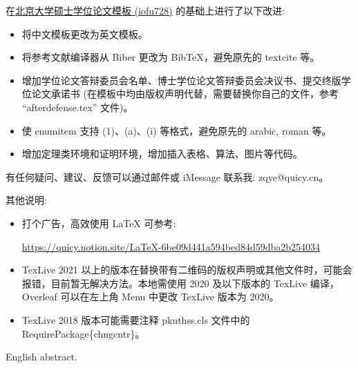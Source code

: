 \begin{cabstract}
    在\href{https://www.overleaf.com/latex/templates/2021-peking-university-master-thesis-template-iofu728-pkuthss/rwfvbkpzydpf}{北京大学硕士学位论文模板 (iofu728)} 的基础上进行了以下改进:
    \begin{itemize}
        \item 将中文模板更改为英文模板。
        \item 将参考文献编译器从 Biber 更改为 BibTeX，避免原先的 textcite 等。
        \item 增加学位论文答辩委员会名单、博士学位论文答辩委员会决议书、提交终版学位论文承诺书 (在模板中均由版权声明代替，需要替换你自己的文件，参考 ``afterdefense.tex'' 文件)。
        \item 使 enumitem 支持 (1)、(a)、(i) 等格式，避免原先的 arabic, roman 等。
        \item 增加定理类环境和证明环境，增加插入表格、算法、图片等代码。
    \end{itemize}

    \bigskip
    \bigskip

    有任何疑问、建议、反馈可以通过邮件或 iMessage 联系我: zqye@quicy.cn。
    
    \bigskip
    \bigskip
    
    其他说明:
    \begin{itemize}
        \item 打个广告，高效使用 LaTeX 可参考:

\url{https://quicy.notion.site/LaTeX-6be09d441a594bed84d59dba2b254034}
        \item TexLive 2021 以上的版本在替换带有二维码的版权声明或其他文件时，可能会报错，目前暂无解决方法。本地需使用 2020 及以下版本的 TexLive 编译，Overleaf 可以在左上角 Menu 中更改 TexLive 版本为 2020。
        \item TexLive 2018 版本可能需要注释 pkuthss.cls 文件中的 \\RequirePackage\{chngcntr\}。
    \end{itemize}
    
    
    


\end{cabstract}

\begin{eabstract}
English abstract.
\end{eabstract}
